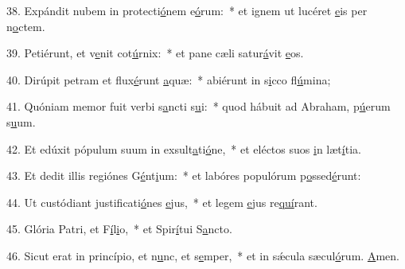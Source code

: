 38. Expándit nubem in protecti\uline{ó}nem e\uline{ó}rum:~* et ignem ut lucéret \uline{e}is per n\uline{o}ctem.\par 
39. Petiérunt, et v\uline{e}nit cot\uline{ú}rnix:~* et pane cæli satur\uline{á}vit \uline{e}os.\par 
40. Dirúpit petram et flux\uline{é}runt \uline{a}quæ:~* abiérunt in s\uline{i}cco fl\uline{ú}mina;\par 
41. Quóniam memor fuit verbi s\uline{a}ncti s\uline{u}i:~* quod hábuit ad Abraham, p\uline{ú}erum s\uline{u}um.\par 
42. Et edúxit pópulum suum in exsult\uline{a}ti\uline{ó}ne,~* et eléctos suos \uline{i}n læt\uline{í}tia.\par 
43. Et dedit illis regiónes G\uline{é}nt\uline{i}um:~* et labóres populórum p\uline{o}ssed\uline{é}runt:\par 
44. Ut custódiant justificati\uline{ó}nes \uline{e}jus,~* et legem \uline{e}jus re\uline{quí}rant.\par 
45. Glória Patri, et F\uline{í}l\uline{i}o,~* et Spir\uline{í}tui S\uline{a}ncto.\par 
46. Sicut erat in princípio, et n\uline{u}nc, et s\uline{e}mper,~* et in sǽcula sæcul\uline{ó}rum. \uline{A}men.\par 
